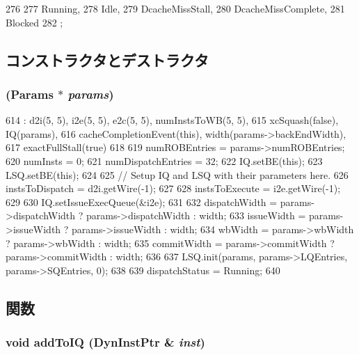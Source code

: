 \begin{DoxyCode}
276                 {
277         Running,
278         Idle,
279         DcacheMissStall,
280         DcacheMissComplete,
281         Blocked
282     };
\end{DoxyCode}


\subsection{コンストラクタとデストラクタ}
\hypertarget{classBackEnd_a8698a618ba78dbd457f2cee79a739588}{
\subsubsection[{BackEnd}]{ ({\bf Params} $\ast$ {\em params})}}
\label{classBackEnd_a8698a618ba78dbd457f2cee79a739588}



\begin{DoxyCode}
614     : d2i(5, 5), i2e(5, 5), e2c(5, 5), numInstsToWB(5, 5),
615       xcSquash(false), IQ(params),
616       cacheCompletionEvent(this), width(params->backEndWidth),
617       exactFullStall(true)
618 {
619     numROBEntries = params->numROBEntries;
620     numInsts = 0;
621     numDispatchEntries = 32;
622     IQ.setBE(this);
623     LSQ.setBE(this);
624 
625     // Setup IQ and LSQ with their parameters here.
626     instsToDispatch = d2i.getWire(-1);
627 
628     instsToExecute = i2e.getWire(-1);
629 
630     IQ.setIssueExecQueue(&i2e);
631 
632     dispatchWidth = params->dispatchWidth ? params->dispatchWidth : width;
633     issueWidth = params->issueWidth ? params->issueWidth : width;
634     wbWidth = params->wbWidth ? params->wbWidth : width;
635     commitWidth = params->commitWidth ? params->commitWidth : width;
636 
637     LSQ.init(params, params->LQEntries, params->SQEntries, 0);
638 
639     dispatchStatus = Running;
640 }
\end{DoxyCode}


\subsection{関数}
\hypertarget{classBackEnd_a2c7b6d036b77d997f9c6f718ddf0be7d}{
\subsubsection[{addToIQ}]{\setlength{\rightskip}{0pt plus 5cm}void addToIQ ({\bf DynInstPtr} \& {\em inst})}}
\label{classBackEnd_a2c7b6d036b77d997f9c6f718ddf0be7d}



